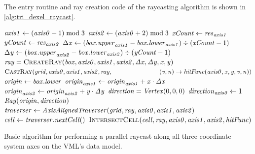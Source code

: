 The entry routine and ray creation code of the raycasting algorithm is shown in \cref{alg:tri_dexel_raycast}.
%
\begin{algorithm}
	\centering
	\begin{algorithmic}[1]
				\State $\mathit{axis1} \gets (\mathit{axis0} + 1) \bmod 3$
				\State $\mathit{axis2} \gets (\mathit{axis0} + 2) \bmod 3$
				\State $\mathit{xCount} \gets \mathit{res}_{\mathit{axis1}}$
				\State $\mathit{yCount} \gets \mathit{res}_{\mathit{axis2}}$
				\State $\Delta \mathit{x} \gets (\mathit{box}.\mathit{upper}_{\mathit{axis1}} - \mathit{box}.\mathit{lower}_{\mathit{axis1}}) \div (\mathit{xCount} - 1)$
				\State $\Delta \mathit{y} \gets (\mathit{box}.\mathit{upper}_{\mathit{axis2}} - \mathit{box}.\mathit{lower}_{\mathit{axis2}}) \div (\mathit{yCount} - 1)$
						\State $\var{ray} = \Call{CreateRay}{\var{box}, \var{axis0}, \var{axis1}, \var{axis2}, \var{\Delta x}, \var{\Delta y}, \var{x}, \var{y}}$
						\State $\Call{CastRay}{\var{grid}, \var{axis0}, \var{axis1}, \var{axis2}, \var{ray},\hfill\break
							\hspace*{\dimexpr\algorithmicindent*5}(\var{v}, \var{n}) \rightarrow \var{hitFunc}(\var{axis0}, \var{x}, \var{y}, \var{v}, \var{n})}$
					\EndFor
				\EndFor
			\EndFor
		\EndProcedure
		\\
			\State $\mathit{origin} \gets \mathit{box}.\mathit{lower}$
			\State $\mathit{origin}_{\mathit{axis1}} \gets \mathit{origin}_{\mathit{axis1}} + \mathit{x} \cdot \mathit{\Delta x}$
			\State $\mathit{origin}_{\mathit{axis2}} \gets \mathit{origin}_{\mathit{axis2}} + \mathit{y} \cdot \mathit{\Delta y}$
			\State $\mathit{direction} = \mathit{Vertex}(0, 0, 0)$
			\State $\mathit{direction}_{\mathit{axis0}} \gets 1$
			\State \Return $\mathit{Ray}(\mathit{origin}, \mathit{direction})$
		\EndFunction
		\\
			\State $\mathit{traverser} \gets \mathit{AxisAlignedTraverser}(\mathit{grid}, \mathit{ray}, \mathit{axis0}, \mathit{axis1}, \mathit{axis2})$
				\State $\mathit{cell} \gets \mathit{traverser}.\mathit{nextCell}()$
				\State $\Call{IntersectCell}{\var{cell}, \var{ray}, \var{axis0}, \var{axis1}, \var{axis2}, \var{hitFunc}}$
			\EndWhile
		\EndProcedure
	\end{algorithmic}
	\caption{
		Basic algorithm for performing a parallel raycast along all three coordinate system axes on the VML's data model.
	}
	\label{alg:tri_dexel_raycast}
\end{algorithm}
